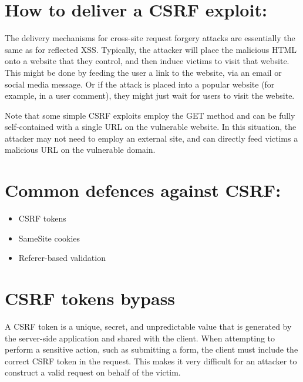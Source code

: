 \documentclass{article}
\begin{document}
\section*{How to deliver a CSRF exploit:}
 The delivery mechanisms for cross-site request forgery attacks are essentially the same as for reflected XSS. Typically, the attacker will place the malicious HTML onto a website that they control, and then induce victims to visit that website. This might be done by feeding the user a link to the website, via an email or social media message. Or if the attack is placed into a popular website (for example, in a user comment), they might just wait for users to visit the website.
 \vspace{5px}
 
Note that some simple CSRF exploits employ the GET method and can be fully self-contained with a single URL on the vulnerable website. In this situation, the attacker may not need to employ an external site, and can directly feed victims a malicious URL on the vulnerable domain.

\section*{Common defences against CSRF:}
\begin{itemize}
    \item CSRF tokens
    \item SameSite cookies
    \item Referer-based validation
\end{itemize}

\newpage

\section*{CSRF tokens bypass}
A CSRF token is a unique, secret, and unpredictable value that is generated by the server-side application and shared with the client. When attempting to perform a sensitive action, such as submitting a form, the client must include the correct CSRF token in the request. This makes it very difficult for an attacker to construct a valid request on behalf of the victim. 
\end{document}
